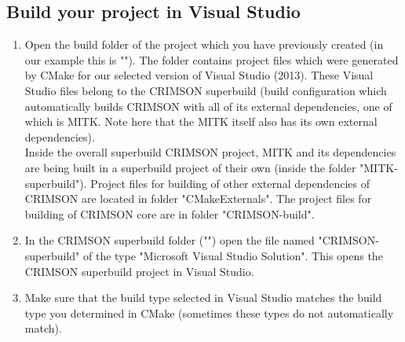 \documentclass[]{scrartcl}
\begin{document}
\subsection{Build your project in Visual Studio}

\begin{enumerate}
	\item Open the build folder of the project which you have previously created (in our example this is "").
	The folder contains project files which were generated by CMake for our selected version of Visual Studio (2013). These Visual Studio files belong to the CRIMSON superbuild (build configuration which automatically builds CRIMSON with all of its external dependencies, one of which is MITK. Note here that the MITK itself also has its own external dependencies). 
	\\Inside the overall superbuild CRIMSON project, MITK and its dependencies are being built in a superbuild project of their own (inside the folder "MITK-superbuild"). Project files for building of other external dependencies of CRIMSON are located in folder "CMakeExternals". The project files for building of CRIMSON core are in folder "CRIMSON-build".
	\item In the CRIMSON superbuild folder ("") open the file named "CRIMSON-superbuild" of the type "Microsoft Visual Studio Solution". This opens the CRIMSON superbuild project in Visual Studio.
	\item Make sure that the build type selected in Visual Studio matches the build type you determined in CMake (sometimes these types do not automatically match).
	

\end{enumerate}
\end{document}
